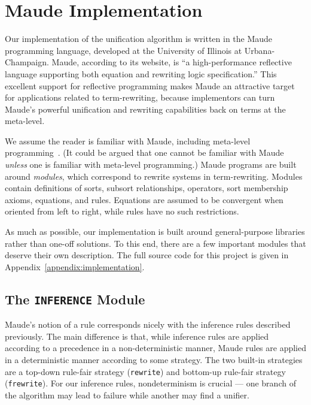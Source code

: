 \documentclass[11pt]{article}
\newcommand{\TitleListing}[1]{\texorpdfstring{\lstinline|#1|}{#1}}
\begin{document}
\section{Maude Implementation}\label{section:maude}

Our implementation of the unification algorithm is written in the Maude
programming language, developed at the University of Illinois at
Urbana-Champaign. Maude, according to its website, is ``a high-performance
reflective language supporting both equation and rewriting logic
specification.'' This excellent support for reflective programming makes Maude
an attractive target for applications related to term-rewriting, because
implementors can turn Maude's powerful unification and rewriting capabilities
back on terms at the meta-level.

We assume the reader is familiar with Maude, including meta-level
programming~\cite{clavel2011maude}. (It could be argued that one cannot be
familiar with Maude \emph{unless} one is familiar with meta-level programming.)
Maude programs are built around \emph{modules}, which correspond to rewrite
systems in term-rewriting. Modules contain definitions of sorts, subsort
relationships, operators, sort membership axioms, equations, and rules.
Equations are assumed to be convergent when oriented from left to right, while
rules have no such restrictions.

As much as possible, our implementation is built around general-purpose
libraries rather than one-off solutions. To this end, there are a few important
modules that deserve their own description. The full source code for this
project is given in Appendix~\ref{appendix:implementation}.

\subsection{The \TitleListing{INFERENCE} Module}\label{subsection:inference-mod}

Maude's notion of a rule corresponds nicely with the inference rules described
previously. The main difference is that, while inference rules are applied
according to a precedence in a non-deterministic manner, Maude rules are applied
in a deterministic manner according to some strategy. The two built-in strategies
are a top-down rule-fair strategy (\lstinline|rewrite|) and bottom-up rule-fair
strategy (\lstinline|frewrite|). For our inference rules, nondeterminism is
crucial --- one branch of the algorithm may lead to failure while another may
find a unifier.
\end{document}
